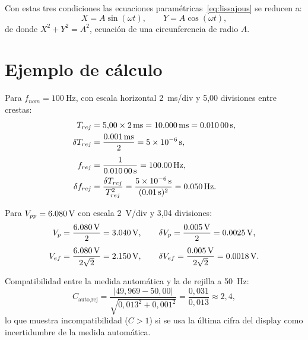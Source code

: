 \documentclass[12pt,a4paper]{article}
\begin{document}
Con estas tres condiciones las ecuaciones paramétricas~\eqref{eq:lissajous} se reducen a:
\[
X = A\sin(\omega t), \qquad Y = A\cos(\omega t),
\]
de donde $X^2 + Y^2 = A^2$, ecuación de una circunferencia de radio $A$.

\section{Ejemplo de cálculo}

Para $f_{nom} = \SI{100}{\hertz}$, con escala horizontal \SI{2}{ms/div} y 5,00 divisiones entre crestas:
\begin{align*}
T_{rej} &= 5{,}00 \times \SI{2}{ms} = \SI{10{,}000}{ms} = \SI{0{,}01000}{s}, \\
\delta T_{rej} &= \frac{\SI{0{,}001}{ms}}{2} = \SI{5e-6}{s}, \\[4pt]
f_{rej} &= \frac{1}{\SI{0{,}01000}{s}} = \SI{100{,}00}{Hz}, \\
\delta f_{rej} &= \frac{\delta T_{rej}}{T_{rej}^{2}} = \frac{\SI{5e-6}{s}}{(\SI{0{,}01}{s})^{2}} = \SI{0{,}050}{Hz}.
\end{align*}

Para $V_{pp} = \SI{6{,}080}{V}$ con escala \SI{2}{V/div} y 3,04 divisiones:
\begin{align*}
V_p &= \frac{\SI{6{,}080}{V}}{2} = \SI{3{,}040}{V}, \qquad
\delta V_p = \frac{\SI{0{,}005}{V}}{2} = \SI{0{,}0025}{V}, \\[4pt]
V_{ef} &= \frac{\SI{6{,}080}{V}}{2\sqrt{2}} = \SI{2{,}150}{V}, \qquad
\delta V_{ef} = \frac{\SI{0{,}005}{V}}{2\sqrt{2}} = \SI{0{,}0018}{V}.
\end{align*}

Compatibilidad entre la medida automática y la de rejilla a \SI{50}{Hz}:
\[
C_{\text{auto},\text{rej}} = \frac{|49{,}969 - 50{,}00|}{\sqrt{0{,}013^2 + 0{,}001^2}} = \frac{0{,}031}{0{,}013} \approx 2{,}4,
\]
lo que muestra incompatibilidad ($C > 1$) si se usa la última cifra del display como incertidumbre de la medida automática.
\end{document}
